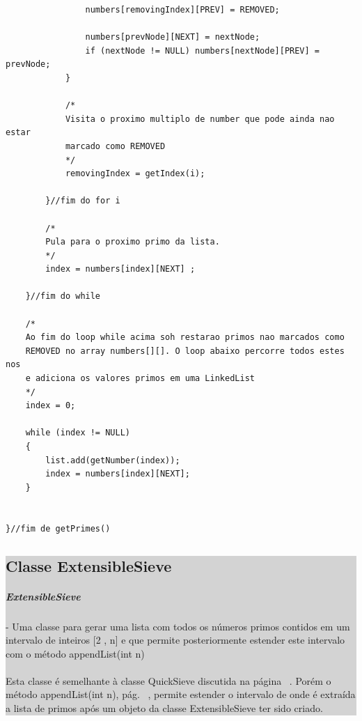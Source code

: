 \documentclass[a4paper,12pt,openany]{book}
\begin{document}
\begin{lstlisting}
				numbers[removingIndex][PREV] = REMOVED;
				
				numbers[prevNode][NEXT] = nextNode;
				if (nextNode != NULL) numbers[nextNode][PREV] = prevNode;
			}
			
			/*
			Visita o proximo multiplo de number que pode ainda nao estar
			marcado como REMOVED
			*/
			removingIndex = getIndex(i);
			
		}//fim do for i
		
		/*
		Pula para o proximo primo da lista.
		*/
		index = numbers[index][NEXT] ;
	
	}//fim do while
	
	/*
	Ao fim do loop while acima soh restarao primos nao marcados como 
	REMOVED no array numbers[][]. O loop abaixo percorre todos estes nos 
	e adiciona os valores primos em uma LinkedList
	*/
	index = 0;
	
	while (index != NULL)
	{
		list.add(getNumber(index));
		index = numbers[index][NEXT]; 
	}


}//fim de getPrimes()

\end{lstlisting}

\newpage

\colorbox{lightgrey}{
	
	\begin{minipage}{18cm}
		
		\chapter*{Classe ExtensibleSieve}
		\label{classe:ExtensibleSieve}
		
		\paragraph{ExtensibleSieve} - Uma classe para gerar uma lista com todos os números primos contidos em um intervalo de inteiros [2 , n] e que permite posteriormente estender este intervalo com o método appendList(int n)
		\\
		\\
		Esta classe é semelhante à classe QuickSieve discutida na página ~\pageref{classe:QuickSieve}. Porém o método appendList(int n), pág. ~\pageref{metodo:appendList()}, permite estender o intervalo de onde é extraída a lista de primos após um objeto da classe ExtensibleSieve ter sido criado.
		
	\end{minipage}

}%
\end{document}
